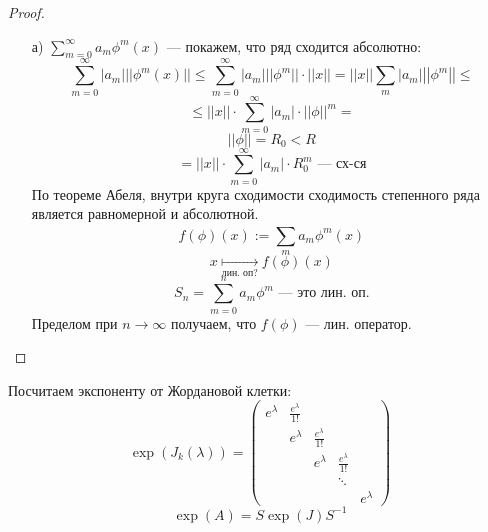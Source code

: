 \begin{proof}
    \begin{itemize}
        \item [а) ] $\sum_{m = 0}^{\infty} a_m \phi^{m}(x)$ --- покажем, что ряд сходится абсолютно:
            \[
            \sum_{m = 0}^{\infty} |a_m| ||\phi^{m}(x)|| \leq \sum_{m = 0}^{\infty} |a_m| ||\phi^{m}|| \cdot ||x|| = ||x|| \sum_{m}^{} |a_m| \left|\left|\phi^{m}\right|\right| \leq
            \]
            \[
            \leq ||x|| \cdot \sum_{m = 0}^{\infty} |a_m| \cdot ||\phi||^{m} = 
            \]
            \[
            ||\phi|| = R_0 < R
            \]
            \[
             = ||x|| \cdot \sum_{m = 0}^{\infty} |a_m| \cdot R_0^{m} \text{ --- сх-ся}
            \]
        По теореме Абеля, внутри круга сходимости сходимость степенного ряда является равномерной и абсолютной.
        \[
        f(\phi)(x) := \sum_{m}^{} a_m \phi^{m}(x)
        \]
        \[
        x \underset{\text{лин. оп?}}{\mapsto} f(\phi)(x)
        \]
        \[
        S_n = \sum_{m = 0}^{n} a_m \phi^{m} \text{ --- это лин. оп.}
        \]
        Пределом при $n \rightarrow \infty$ получаем, что $f(\phi)$ --- лин. оператор.
    \end{itemize}
\end{proof}
\begin{example}
Посчитаем экспоненту от Жордановой клетки:
\[
    \exp (J_k(\lambda)) = \begin{pmatrix}e^{\lambda} & \frac{e^{\lambda}}{1!}\\ & e^{\lambda} & \frac{e^{\lambda}}{1!} \\ & & e^{\lambda} & \frac{e^{\lambda}}{1!}\\ & & & \ddots \\ & & & & e^{\lambda} \end{pmatrix}
\]
\[
    \exp(A) = S \exp(J) S^{-1}
\]
\end{example}
